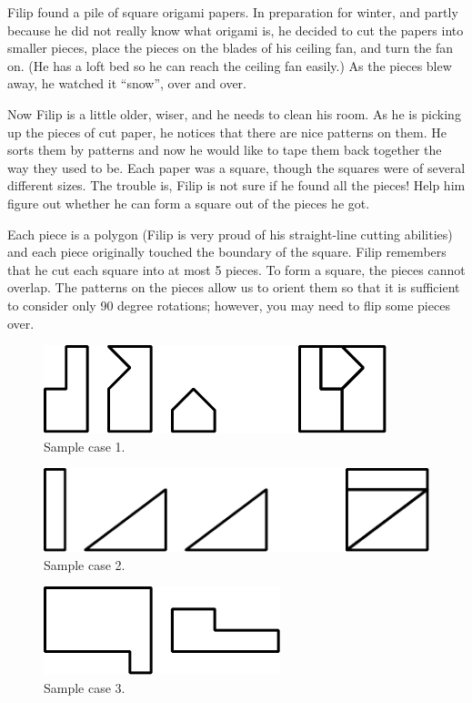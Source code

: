 
Filip found a pile of square origami papers. In preparation for
winter, and partly because he did not really know what origami is, he
decided to cut the papers into smaller pieces, place the pieces on the
blades of his ceiling fan, and turn the fan on. (He has a loft bed so
he can reach the ceiling fan easily.) As the pieces blew away, he
watched it ``snow'', over and over.

Now Filip is a little older, wiser, and he needs to clean his room. As
he is picking up the pieces of cut paper, he notices that there are
nice patterns on them. He sorts them by patterns and now he would like
to tape them back together the way they used to be. Each paper was a
square, though the squares were of several different sizes. The
trouble is, Filip is not sure if he found all the pieces! Help him
figure out whether he can form a square out of the pieces he got.

Each piece is a polygon (Filip is very proud of his straight-line
cutting abilities) and each piece originally touched the boundary of
the square. Filip remembers that he cut each square into at most 5
pieces. To form a square, the pieces cannot overlap. The patterns on
the pieces allow us to orient them so that it is sufficient to
consider only 90 degree rotations; however, you may need to flip some
pieces over.

\begin{figure}[h]
  \centering
  \includegraphics{case1}
  \caption{Sample case 1.}
\label{fig:sample1}
\end{figure}
\begin{figure}[h]
  \centering
  \includegraphics{case2}
  \caption{Sample case 2.}
\label{fig:sample2}
\end{figure}
\begin{figure}[h]
  \centering
  \includegraphics{case3}
  \caption{Sample case 3.}
\label{fig:sample3}
\end{figure}

